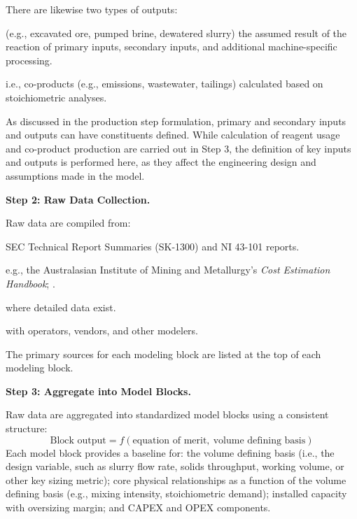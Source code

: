 There are likewise two types of outputs:

\begin{description}[noitemsep, topsep=0pt]
    \item[\textbullet\enskip Primary outputs] (e.g., excavated ore, pumped brine, dewatered slurry) the assumed result of the reaction of primary inputs, secondary inputs, and additional machine-specific processing.
    \item[\textbullet\enskip Secondary outputs] i.e., co-products (e.g.,  emissions, wastewater, tailings) calculated based on stoichiometric analyses.
\end{description}

As discussed in the production step formulation, primary and secondary inputs and outputs can have constituents defined. While calculation of reagent usage and co-product production are carried out in Step 3, the definition of key inputs and outputs is performed here, as they affect the engineering design and assumptions made in the model.

\medskip
\noindent\textbf{Step 2: Raw Data Collection.}\quad

Raw data are compiled from:

\begin{description}[noitemsep, topsep=0pt]
    \item[\textbullet\enskip Feasibility studies and technical reports] SEC Technical Report Summaries (SK-1300) and NI 43-101 reports.
    \item[\textbullet\enskip Vendor specification sheets and package data]
    \item[\textbullet\enskip Standard engineering references] e.g., the Australasian Institute of Mining and Metallurgy's \textit{Cost Estimation Handbook}; \citet{petersPlantDesignEconomics1991}.
    \item[\textbullet\enskip Literature sources] where detailed data exist.
    \item[\textbullet\enskip Interviews and technical discussions] with operators, vendors, and other modelers.
\end{description}

The primary sources for each modeling block are listed at the top of each modeling block.

\medskip
\noindent\textbf{Step 3: Aggregate into Model Blocks.}\quad

Raw data are aggregated into standardized model blocks using a consistent structure:
\begin{equation}
    \text{Block output} = f(\text{equation of merit},\ \text{volume defining basis})
\end{equation}
Each model block provides a baseline for: the volume defining basis (i.e., the design variable, such as slurry flow rate, solids throughput, working volume, or other key sizing metric); core physical relationships as a function of the volume defining basis (e.g., mixing intensity, stoichiometric demand); installed capacity with oversizing margin; and CAPEX and OPEX components.

